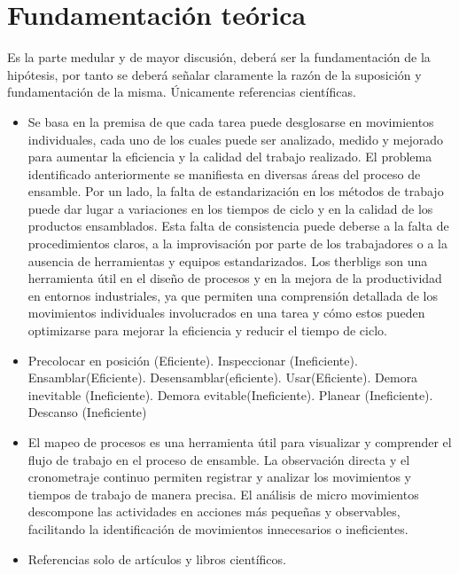     \section{Fundamentación teórica}
    
    Es la parte medular y de mayor discusión, deberá ser la fundamentación de la hipótesis, por tanto se deberá señalar claramente la razón de la suposición y fundamentación de la misma. Únicamente referencias científicas.
    \begin{itemize}
        \item Se basa en la premisa de que cada tarea puede desglosarse en movimientos individuales, cada uno de los cuales puede ser
    analizado, medido y mejorado para aumentar la eficiencia y la calidad del trabajo realizado.
    El problema identificado anteriormente se manifiesta en diversas áreas del proceso de ensamble. Por un lado, la falta de estandarización en los métodos de trabajo puede dar lugar a variaciones en los tiempos de ciclo y en la calidad de los
    productos ensamblados. Esta falta de consistencia puede deberse a la falta de procedimientos claros, a la improvisación por parte de los trabajadores o a la ausencia de herramientas y equipos estandarizados.
    Los therbligs son una herramienta útil en el diseño de procesos y en la mejora de la productividad en entornos industriales, ya que permiten una comprensión detallada de los movimientos individuales involucrados en una tarea y cómo estos pueden optimizarse para mejorar la eficiencia y reducir el tiempo de ciclo.
    
        \item Precolocar en posición (Eficiente).
    Inspeccionar (Ineficiente).
    Ensamblar(Eficiente).
    Desensamblar(eficiente).
    Usar(Eficiente).
    Demora inevitable (Ineficiente).
    Demora evitable(Ineficiente).
    Planear (Ineficiente).
    Descanso (Ineficiente) 
        \item El mapeo de procesos es una herramienta útil para visualizar y comprender el flujo de trabajo en el proceso de
    ensamble. La observación directa y el cronometraje continuo permiten registrar y analizar los movimientos y tiempos de trabajo de manera precisa. El análisis de micro movimientos descompone las actividades en acciones más pequeñas y observables, facilitando la identificación de movimientos innecesarios o ineficientes.
        \item Referencias solo de artículos y libros científicos.
    \end{itemize}
